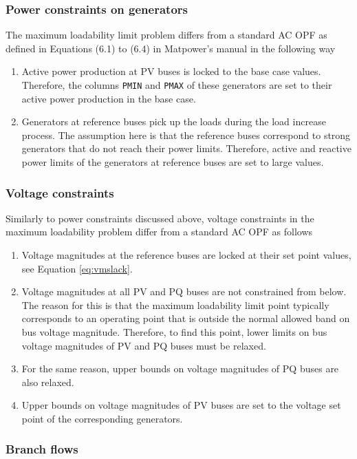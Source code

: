 \documentclass[12pt,a4]{article}
\newcommand*{\codemat}[1]{\texttt{#1}}
\newcommand*{\matpower}{{\sc Matpower}}
\begin{document}
\subsubsection{Power constraints on generators}
\label{sec:constr-gen}


The maximum loadability limit problem differs from a standard AC OPF as defined in Equations (6.1) to (6.4) in \matpower{}'s manual in the following way
\begin{enumerate}
\item Active power production at PV buses is locked to the base case values. Therefore, the columns \codemat{PMIN} and \codemat{PMAX} of these generators are set to their active power production in the base case.
\item Generators at reference buses pick up the loads during the load increase process. The assumption here is that the reference buses correspond to strong generators that do not reach their power limits. Therefore, active and reactive power limits of the generators at reference buses are set to large values.
\end{enumerate}

\subsubsection{Voltage constraints}
\label{sec:volt-constr-at}
Similarly to power constraints discussed above, voltage constraints in the maximum loadability problem differ from a standard AC OPF as follows
\begin{enumerate}
\item Voltage magnitudes at the reference buses are locked at their set point values, see Equation \eqref{eq:vmslack}.
\item Voltage magnitudes at all PV and PQ buses are not constrained from below. The reason for this is that the maximum loadability limit point typically corresponds to an operating point that is outside the normal allowed band on bus voltage magnitude. Therefore, to find this point, lower limits on bus voltage magnitudes of PV and PQ buses must be relaxed.
\item For the same reason, upper bounds on voltage magnitudes of PQ buses are also relaxed.
\item Upper bounds on voltage magnitudes of PV buses are set to the voltage set point of the corresponding generators.
\end{enumerate}

\subsubsection{Branch flows}
\label{sec:branch-flows}
\end{document}
